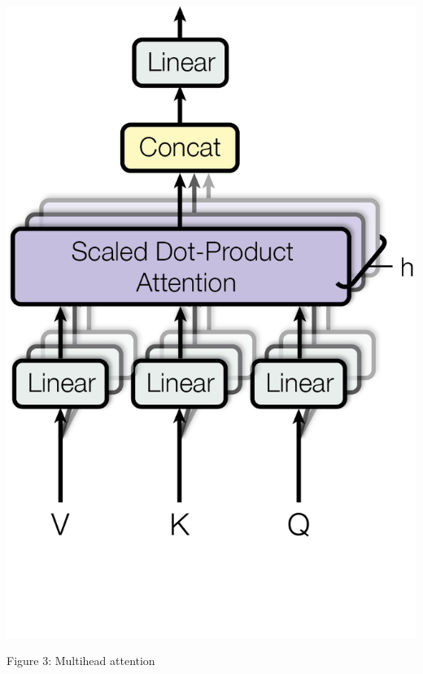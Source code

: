 \documentclass{article}
\begin{document}
\begin{minipage}{0.49\textwidth}
 \centering
 \includegraphics[width=1\linewidth]{Multihead attention.png}
 \caption{Figure 3: Multihead attention}
 \label{fig:multihead_attention}
\end{minipage}\hfill
\end{document}

